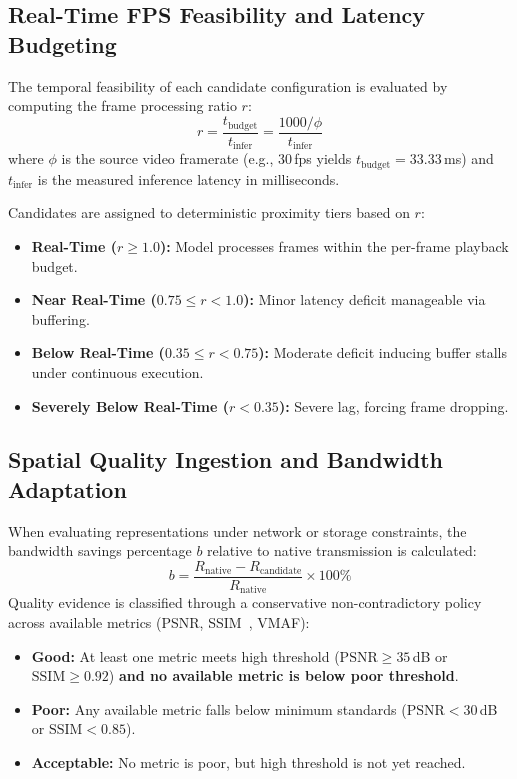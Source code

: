 \documentclass[conference]{IEEEtran}
\begin{document}
\subsection{Real-Time FPS Feasibility and Latency Budgeting}
The temporal feasibility of each candidate configuration is evaluated by computing the frame processing ratio $r$:
\begin{equation}
r = \frac{t_{\text{budget}}}{t_{\text{infer}}} = \frac{1000 / \phi}{t_{\text{infer}}}
\end{equation}
where $\phi$ is the source video framerate (e.g., 30\,fps yields $t_{\text{budget}} = 33.33$\,ms) and $t_{\text{infer}}$ is the measured inference latency in milliseconds.

Candidates are assigned to deterministic proximity tiers based on $r$:
\begin{itemize}
    \item \textbf{Real-Time ($r \ge 1.0$):} Model processes frames within the per-frame playback budget.
    \item \textbf{Near Real-Time ($0.75 \le r < 1.0$):} Minor latency deficit manageable via buffering.
    \item \textbf{Below Real-Time ($0.35 \le r < 0.75$):} Moderate deficit inducing buffer stalls under continuous execution.
    \item \textbf{Severely Below Real-Time ($r < 0.35$):} Severe lag, forcing frame dropping.
\end{itemize}

\subsection{Spatial Quality Ingestion and Bandwidth Adaptation}
When evaluating representations under network or storage constraints, the bandwidth savings percentage $b$ relative to native transmission is calculated:
\begin{equation}
b = \frac{R_{\text{native}} - R_{\text{candidate}}}{R_{\text{native}}} \times 100\%
\end{equation}
Quality evidence is classified through a conservative non-contradictory policy across available metrics (PSNR, SSIM~\cite{wang2004image}, VMAF):
\begin{itemize}
    \item \textbf{Good:} At least one metric meets high threshold ($\text{PSNR} \ge 35$\,dB or $\text{SSIM} \ge 0.92$) \textbf{and no available metric is below poor threshold}.
    \item \textbf{Poor:} Any available metric falls below minimum standards ($\text{PSNR} < 30$\,dB or $\text{SSIM} < 0.85$).
    \item \textbf{Acceptable:} No metric is poor, but high threshold is not yet reached.
\end{itemize}
\end{document}

